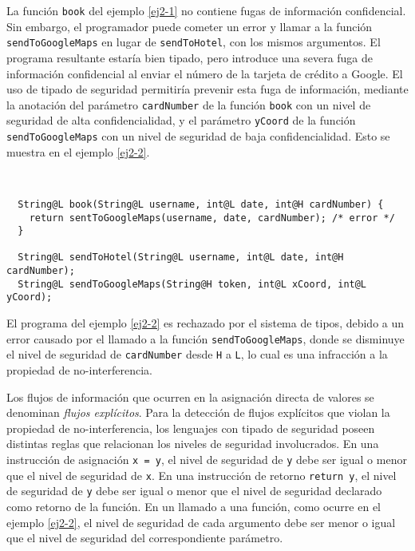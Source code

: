 La función \texttt{book} del ejemplo \ref{ej2-1} no contiene fugas de información confidencial. Sin embargo, el programador puede cometer un error y llamar a la función \texttt{sendToGoogleMaps} en lugar de \texttt{sendToHotel}, con los mismos argumentos. El programa resultante estaría bien tipado, pero introduce una severa fuga de información confidencial al enviar el número de la tarjeta de crédito a Google. El uso de tipado de seguridad permitiría prevenir esta fuga de información, mediante la anotación del parámetro \texttt{cardNumber} de la función \texttt{book} con un nivel de seguridad de alta confidencialidad, y el parámetro \texttt{yCoord} de la función \texttt{sendToGoogleMaps} con un nivel de seguridad de baja confidencialidad. Esto se muestra en el ejemplo \ref{ej2-2}.

\begin{ej} \ \\
  \normalfont
  \label{ej2-2}
\begin{lstlisting}
  String@L book(String@L username, int@L date, int@H cardNumber) {
    return sentToGoogleMaps(username, date, cardNumber); /* error */
  }

  String@L sendToHotel(String@L username, int@L date, int@H cardNumber);
  String@L sendToGoogleMaps(String@H token, int@L xCoord, int@L yCoord);
\end{lstlisting}
\end{ej}

El programa del ejemplo \ref{ej2-2} es rechazado por el sistema de tipos, debido a un error causado por el llamado a la función \texttt{sendToGoogleMaps}, donde se disminuye el nivel de seguridad de \texttt{cardNumber} desde \texttt{H} a \texttt{L}, lo cual es una infracción a la propiedad de no-interferencia.

Los flujos de información que ocurren en la asignación directa de valores se denominan \emph{flujos explícitos}. Para la detección de flujos explícitos que violan la propiedad de no-interferencia, los lenguajes con tipado de seguridad poseen distintas reglas que relacionan los niveles de seguridad involucrados. En una instrucción de asignación \texttt{x = y}, el nivel de seguridad de \texttt{y} debe ser igual o menor que el nivel de seguridad de \texttt{x}. En una instrucción de retorno \texttt{return y}, el nivel de seguridad de \texttt{y} debe ser igual o menor que el nivel de seguridad declarado como retorno de la función. En un llamado a una función, como ocurre en el ejemplo \ref{ej2-2}, el nivel de seguridad de cada argumento debe ser menor o igual que el nivel de seguridad del correspondiente parámetro.

